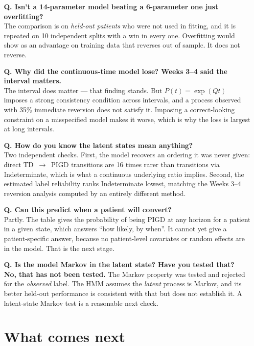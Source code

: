 \documentclass[11pt,a4paper]{article}
\newcommand{\arr}{$\rightarrow$}
\begin{document}
\medskip
\noindent\textbf{Q. Isn't a 14-parameter model beating a 6-parameter one just overfitting?}\\
The comparison is on \emph{held-out patients} who were not used in fitting, and
it is repeated on 10 independent splits with a win in every one. Overfitting
would show as an advantage on training data that reverses out of sample. It
does not reverse.

\medskip
\noindent\textbf{Q. Why did the continuous-time model lose? Weeks 3--4 said the interval matters.}\\
The interval does matter --- that finding stands. But $P(t) = \exp(Qt)$ imposes
a strong consistency condition across intervals, and a process observed with
35\% immediate reversion does not satisfy it. Imposing a correct-looking
constraint on a misspecified model makes it worse, which is why the loss is
largest at long intervals.

\medskip
\noindent\textbf{Q. How do you know the latent states mean anything?}\\
Two independent checks. First, the model recovers an ordering it was never
given: direct TD~\arr~PIGD transitions are 16 times rarer than transitions via
Indeterminate, which is what a continuous underlying ratio implies. Second, the
estimated label reliability ranks Indeterminate lowest, matching the Weeks 3--4
reversion analysis computed by an entirely different method.

\medskip
\noindent\textbf{Q. Can this predict when a patient will convert?}\\
Partly. The table gives the probability of being PIGD at any horizon for a
patient in a given state, which answers ``how likely, by when''. It cannot yet
give a patient-specific answer, because no patient-level covariates or random
effects are in the model. That is the next stage.

\medskip
\noindent\textbf{Q. Is the model Markov in the latent state? Have you tested that?}\\
\textbf{No, that has not been tested.} The Markov property was tested and
rejected for the \emph{observed} label. The HMM assumes the \emph{latent}
process is Markov, and its better held-out performance is consistent with that
but does not establish it. A latent-state Markov test is a reasonable next
check.

\section{What comes next}
\end{document}
